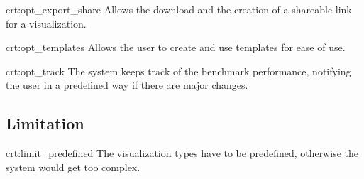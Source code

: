 {crt:opt_export_share}
{Allows the download and the creation of a shareable link for a \gls{visualization}.}

{crt:opt_templates}
{Allows the \gls{user} to create and use \glspl{template} for ease of use.}

{crt:opt_track}
{The system keeps track of the benchmark performance, notifying the \gls{user} in a predefined way if there are major changes.}


\subsection{Limitation}

{crt:limit_predefined}
{The \gls{visualization} types have to be predefined, otherwise the system would get too complex.}
